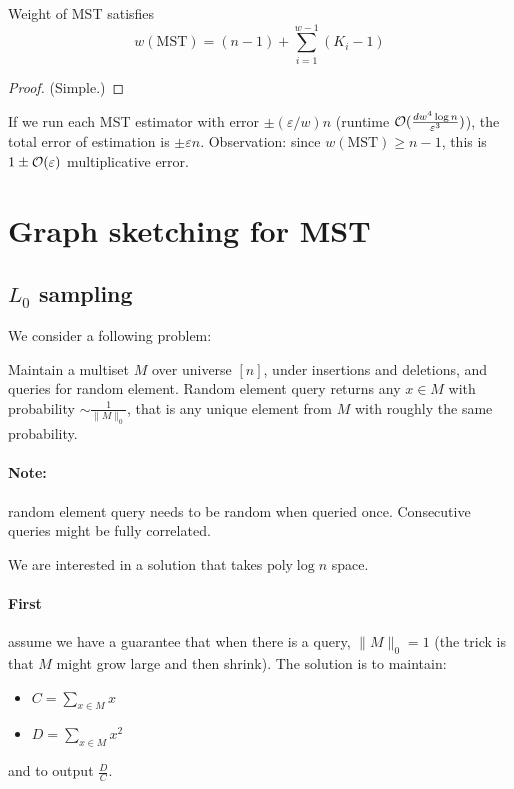 \documentclass[11pt]{article}
\begin{document}
\begin{theorem}
Weight of MST satisfies
$$w(\text{MST}) = (n-1) + \sum_{i=1}^{w-1} (K_i - 1)$$
\end{theorem}
\begin{proof} (Simple.)
\end{proof}


If we run each MST estimator with error $\pm (\varepsilon/w)n$ (runtime $\mathcal{O}(\frac{d w^4 \log n}{\varepsilon^3})$), the total error of estimation is $\pm \varepsilon n$. Observation: since $w(\text{MST}) \ge n-1$, this is $1\pm \mathcal{O}(\varepsilon)$ multiplicative error.


\section{Graph sketching for MST \cite{DBLP:conf/pods/AhnGM12}}
\subsection{$L_0$ sampling}
We consider a following problem:
\begin{definition}
Maintain a multiset $M$ over universe $[n]$, under insertions and deletions, and queries for random element. Random element query returns any $x \in M$ with probability $\sim \frac{1}{\|M\|_0}$, that is any unique element from $M$ with roughly the same probability.
\end{definition}

\paragraph{Note:} random element query needs to be random when queried once. Consecutive queries might be fully correlated.

We are interested in a solution that takes $\text{poly} \log n$ space.

\paragraph{First} assume we have a guarantee that when there is a query, $\|M\|_0 = 1$ (the trick is that $M$ might grow large and then shrink). The solution is to maintain:
\begin{itemize}
\item $C = \sum_{x \in M} x$
\item $D = \sum_{x \in M} x^2$
\end{itemize}
and to output $\frac{D}{C}$.
\end{document}

